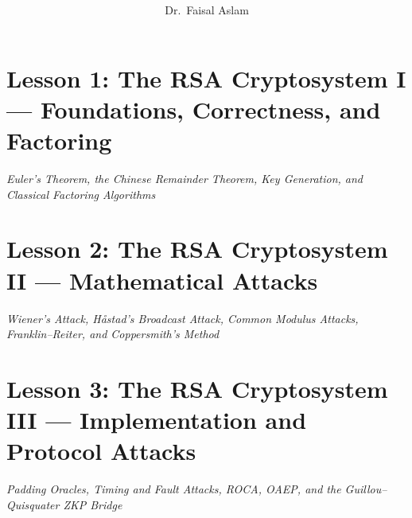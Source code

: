 \documentclass[11pt,a4paper,oneside]{book}
\title{\textbf{\seriestitle}}
\author{Dr.\ Faisal Aslam}
\date{}
\begin{document}
\maketitle
\tableofcontents

\chapter{Lesson 1: The RSA Cryptosystem I --- Foundations, Correctness, and Factoring}
\begin{center}
\large\itshape Euler's Theorem, the Chinese Remainder Theorem, Key Generation, and Classical Factoring Algorithms
\end{center}
\vspace{0.4cm}


\chapter{Lesson 2: The RSA Cryptosystem II --- Mathematical Attacks}
\begin{center}
\large\itshape Wiener's Attack, Håstad's Broadcast Attack, Common Modulus Attacks, Franklin--Reiter, and Coppersmith's Method
\end{center}
\vspace{0.4cm}


\chapter{Lesson 3: The RSA Cryptosystem III --- Implementation and Protocol Attacks}
\begin{center}
\large\itshape Padding Oracles, Timing and Fault Attacks, ROCA, OAEP, and the Guillou--Quisquater ZKP Bridge
\end{center}
\vspace{0.4cm}

\end{document}
